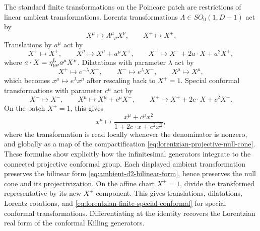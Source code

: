 The standard finite transformations on the Poincare patch are restrictions of
linear ambient transformations.  Lorentz transformations \(\Lambda\in
SO_0(1,D-1)\) act by
\[
  X^\mu\mapsto \Lambda^\mu{}_\nu X^\nu,\qquad
  X^\pm\mapsto X^\pm .
\]
Translations by \(a^\mu\) act by
\begin{equation}
  X^+\mapsto X^+,\qquad
  X^\mu\mapsto X^\mu+a^\mu X^+,\qquad
  X^-\mapsto X^-+2a\cdot X+a^2X^+,
  \label{eq:ambient-translation}
\end{equation}
where \(a\cdot X=\eta^{\rm L}_{\mu\nu}a^\mu X^\nu\).  Dilatations with
parameter \(\lambda\) act by
\begin{equation}
  X^+\mapsto e^{-\lambda}X^+,\qquad
  X^-\mapsto e^\lambda X^-,\qquad
  X^\mu\mapsto X^\mu ,
  \label{eq:ambient-dilatation}
\end{equation}
which becomes \(x^\mu\mapsto e^\lambda x^\mu\) after rescaling back to
\(X^+=1\).  Special conformal transformations with parameter \(c^\mu\) act by
\begin{equation}
  X^-\mapsto X^-,\qquad
  X^\mu\mapsto X^\mu+c^\mu X^-,\qquad
  X^+\mapsto X^+ +2c\cdot X+c^2X^- .
  \label{eq:ambient-special-conformal}
\end{equation}
On the patch \(X^+=1\), this gives
\begin{equation}
  x^\mu
  \longmapsto
  \frac{x^\mu+c^\mu x^2}{1+2c\cdot x+c^2x^2},
  \label{eq:lorentzian-finite-special-conformal}
\end{equation}
where the transformation is read locally whenever the denominator is nonzero,
and globally as a map of the compactification
\eqref{eq:lorentzian-projective-null-cone}.  These formulae show explicitly
how the infinitesimal generators integrate to the connected projective
conformal group.
Each displayed ambient transformation preserves the bilinear form
\eqref{eq:ambient-d2-bilinear-form}, hence preserves the null cone and its
projectivization.  On the affine chart \(X^+=1\), divide the transformed
representative by its new \(X^+\)-component.  This gives translations,
dilatations, Lorentz rotations, and
\eqref{eq:lorentzian-finite-special-conformal} for special conformal
transformations.  Differentiating at the identity recovers the Lorentzian real
form of the conformal Killing generators.

